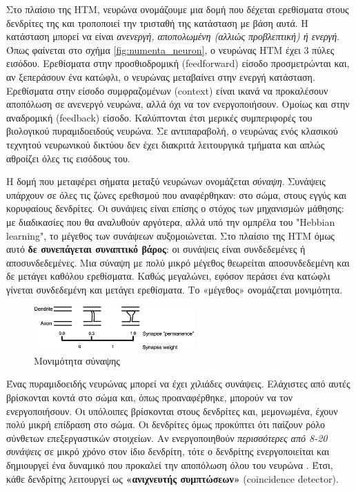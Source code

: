 	Στο πλαίσιο της HTM, νευρώνα ονομάζουμε μια δομή που δέχεται ερεθίσματα στους δενδρίτες της και τροποποιεί την τρισταθή της κατάσταση με βάση αυτά.
	Η κατάσταση μπορεί να είναι \textit{ανενεργή, αποπολωμένη (αλλιώς προβλεπτική) ή ενεργή}.
	Όπως φαίνεται στο σχήμα \ref{fig:numenta_neuron}, ο νευρώνας HTM έχει 3 πύλες εισόδου.
	Ερεθίσματα στην προσθιοδρομική (feedforward) είσοδο προσμετρώνται και, αν ξεπεράσουν ένα κατώφλι, ο νευρώνας μεταβαίνει στην ενεργή κατάσταση.
	Ερεθίσματα στην είσοδο συμφραζομένων (context) είναι ικανά να προκαλέσουν αποπόλωση σε ανενεργό νευρώνα, αλλά όχι να τον ενεργοποιήσουν.
	Ομοίως και στην αναδρομική (feedback) είσοδο.
	Καλύπτονται έτσι μερικές συμπεριφορές του βιολογικού πυραμιδοειδούς νευρώνα.
	Σε αντιπαραβολή, ο νευρώνας ενός κλασικού τεχνητού νευρωνικού δικτύου δεν έχει διακριτά λειτουργικά τμήματα και απλώς αθροίζει όλες τις εισόδους του.

	Η δομή που μεταφέρει σήματα μεταξύ νευρώνων ονομάζεται \textit{σύναψη}. Συνάψεις υπάρχουν σε όλες τις ζώνες ερεθισμού που αναφέρθηκαν:
	στο σώμα, στους εγγύς και κορυφαίους δενδρίτες.
	Οι συνάψεις είναι επίσης ο στόχος των μηχανισμών μάθησης: με διαδικασίες που θα αναλυθούν αργότερα, αλλά υπό την ομπρέλα του "Hebbian learning",
	το μέγεθος των συνάψεων αυξομοιώνεται.
	Στο πλαίσιο της HTM όμως αυτό \textbf{δε συνεπάγεται συναπτικό βάρος}: οι συνάψεις είναι συνδεδεμένες ή αποσυνδεδεμένες.
	Μια σύναψη με πολύ μικρό μέγεθος θεωρείται αποσυνδεδεμένη και δε μετάγει καθόλου ερεθίσματα.
	Καθώς μεγαλώνει, εφόσον περάσει ένα κατώφλι γίνεται συνδεδεμένη και μετάγει ερεθίσματα.
	Το «μέγεθος» ονομάζεται μονιμότητα.

	\begin{figure}
		\centering
		\includegraphics[width=0.55\textwidth]{figures/synapse_permanence}
		\caption{Μονιμότητα σύναψης}
		\label{fig:synapse_permanence}
	\end{figure}

	Ένας πυραμιδοειδής νευρώνας μπορεί να έχει χιλιάδες συνάψεις. Ελάχιστες από αυτές βρίσκονται κοντά στο σώμα και, όπως προαναφέρθηκε, μπορούν να τον ενεργοποιήσουν.
	Οι υπόλοιπες βρίσκονται στους δενδρίτες και, μεμονωμένα, έχουν πολύ μικρή επίδραση στο σώμα.
	Οι δενδρίτες όμως προκύπτει ότι παίζουν ρόλο σύνθετων επεξεργαστικών στοιχείων.
	Αν ενεργοποιηθούν \textit{περισσότερες από 8-20 συνάψεις} σε μικρό χρόνο στον ίδιο δενδρίτη, τότε ο δενδρίτης ενεργοποιείται και δημιουργεί ένα δυναμικό που προκαλεί την αποπόλωση όλου του νευρώνα \parencite{hawkinsWhyNeuronsHave2016}.
	Έτσι, κάθε δενδρίτης λειτουργεί ως \textbf{«ανιχνευτής συμπτώσεων»} (coincidence detector).

